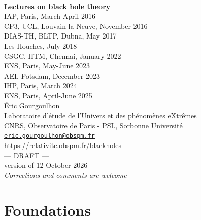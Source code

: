 \documentclass[12pt,a4paper]{book}
\begin{document}
\begin{titlepage}
\
\vspace{4cm}
\begin{center}
{\Huge\textbf{Lectures on black hole theory}}\\[2ex]
{\large IAP, Paris, March-April 2016} \\[1ex]
{\large CP3, UCL, Louvain-la-Neuve, November 2016}\\[1ex]
{\large DIAS-TH, BLTP, Dubna, May 2017}\\[1ex]
{\large Les Houches, July 2018}\\[1ex]
{\large CSGC, IITM, Chennai, January 2022}\\[1ex]
{\large ENS, Paris, May-June 2023}\\[1ex]
{\large AEI, Potsdam, December 2023}\\[1ex]
{\large IHP, Paris, March 2024}\\[1ex]
{\large ENS, Paris, April-June 2025}\\[8ex]
Éric Gourgoulhon\\
Laboratoire d'étude de l'Univers et des phénomènes eXtrêmes\\
CNRS, Observatoire de Paris - PSL, Sorbonne Université\\
\href{mailto:eric.gourgoulhon@obspm.fr}{\texttt{eric.gourgoulhon@obspm.fr}}\\[8ex]
\url{https://relativite.obspm.fr/blackholes}\\[8ex]
{\Huge --- DRAFT ---}\\[2ex]
{version of 12 October 2026}\\[2ex]
\emph{\Large Corrections and comments are welcome}
\end{center}
\end{titlepage}


\dominitoc

\newpage


\setcounter{tocdepth}{1}  %
\tableofcontents

\part{Foundations}

\end{document}
